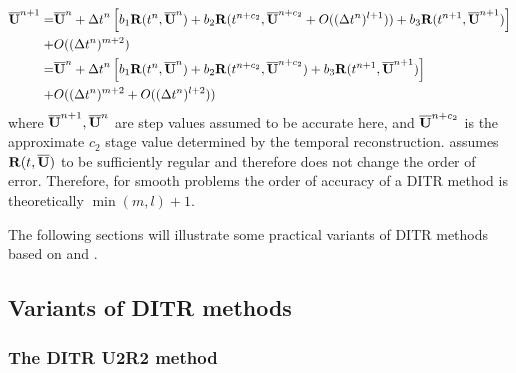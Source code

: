 \begin{equation}
    \begin{aligned}
        \overline{\mathbf{U}}^{n+1} = & \overline{\mathbf{U}}^{n} + {{\Delta} t}^{n}
        \left[
            b_1\mathbf{R}(t^n, \overline{\mathbf{U}}^n)
            +
            b_2\mathbf{R}(t^{n+c_2}, \overline{\mathbf{U}}^{n+c_2} + O(({\Delta} t^{n})^{l+1} ))
            +
            b_3\mathbf{R}(t^{n+1}, \overline{\mathbf{U}}^{n+1})
            \right]
        \\ + &
        O(({\Delta} t^{n})^{m+2} )               \\
        =           &
        \overline{\mathbf{U}}^{n} + {{\Delta} t}^{n}
        \left[
            b_1\mathbf{R}(t^n, \overline{\mathbf{U}}^n)
            +
            b_2\mathbf{R}(t^{n+c_2}, \overline{\mathbf{U}}^{n+c_2})
            +
            b_3\mathbf{R}(t^{n+1}, \overline{\mathbf{U}}^{n+1})
            \right]
        \\ + &
        O(({\Delta} t^{n})^{m+2}  + O(({\Delta} t^{n})^{l+2} ))
    \end{aligned}
    \label{eq:fullLTE}
\end{equation}
where $\overline{\mathbf{U}}^{n+1}, \overline{\mathbf{U}}^{n}$ are step values assumed to be accurate here, and
$\overline{\mathbf{U}}^{n+c_2}$ is the approximate
$c_2$ stage value determined by the temporal reconstruction.
 assumes
$\mathbf{R}(t, \overline{\mathbf{U}})$ to be sufficiently regular and therefore does not
change the order of error.
Therefore, for smooth problems the
order of accuracy of a DITR
method is theoretically $\min(m,l) + 1$.

The following sections will illustrate some
practical variants of DITR methods based on  and .


\subsection{Variants of DITR methods}

\subsubsection{The DITR U2R2 method}

